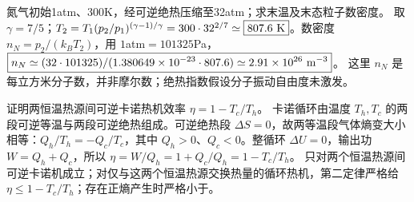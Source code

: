 \problemtext 氮气初始1atm、300K，经可逆绝热压缩至32atm；求末温及末态粒子数密度。
\workings 取 $\gamma=7/5$；$T_2=T_1(p_2/p_1)^{(\gamma-1)/\gamma}=300\cdot32^{2/7}\simeq\boxed{807.6\ {\rm K}}$。数密度 $n_N=p_2/(k_BT_2)$，用 $1$atm$=101325$Pa，$\boxed{n_N\simeq(32\cdot101325)/(1.380649\times10^{-23}\cdot807.6)\simeq2.91\times10^{26}\ {\rm m^{-3}}}$。
\crosscheck 这里 $n_N$ 是每立方米分子数，并非摩尔数；绝热指数假设分子振动自由度未激发。

\problemtext 证明两恒温热源间可逆卡诺热机效率 $\eta=1-T_c/T_h$。
\workings 卡诺循环由温度 $T_h,T_c$ 的两段可逆等温与两段可逆绝热组成。可逆绝热段 $\Delta S=0$，故两等温段气体熵变大小相等：$Q_h/T_h=-Q_c/T_c$，其中 $Q_h>0$、$Q_c<0$。整循环 $\Delta U=0$，输出功 $W=Q_h+Q_c$，所以 $\boxed{\eta=W/Q_h=1+Q_c/Q_h=1-T_c/T_h}$。
\crosscheck 只对两个恒温热源间可逆卡诺机成立；对仅与这两个恒温热源交换热量的循环热机，第二定律严格给$\eta\le1-T_c/T_h$；存在正熵产生时严格小于。
